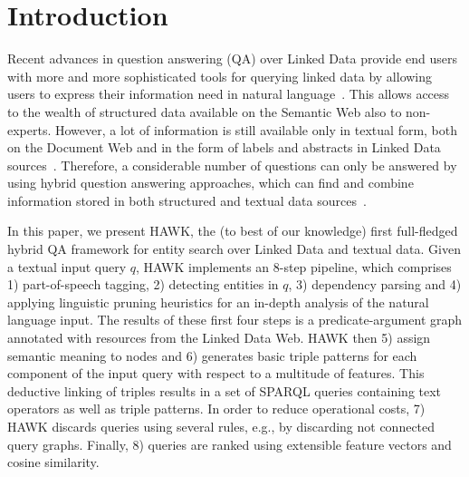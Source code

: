 \documentclass{llncs}
\begin{document}
\section{Introduction}
Recent advances in question answering (QA) over Linked Data provide end users with more and more sophisticated tools for querying linked data by allowing users to express their information need in natural language~\cite{SINA_WebSemantic,tbsl,pythia}. 
This allows access to the wealth of structured data available on the Semantic Web also to non-experts. However, a lot of information is still available only in textual form, both on the Document Web and in the form of labels and abstracts in Linked Data sources~\cite{rdflivenews}.
Therefore, a considerable number of questions can only be answered by using hybrid question answering approaches, which  can find and combine information stored in both structured and textual data sources~\cite{combiningLDandIR}.

In this paper, we present HAWK, the (to best of our knowledge) first full-fledged hybrid QA framework for entity search over Linked Data and textual data. 
Given a textual input query $q$, HAWK implements an 8-step pipeline, which comprises 1) part-of-speech tagging, 2) detecting entities in $q$, 3) dependency parsing and 4) applying linguistic pruning heuristics for an in-depth analysis of the natural language input. 
The results of these first four steps is a predicate-argument graph annotated with resources from the Linked Data Web. HAWK then 5) assign semantic meaning to nodes and 6) generates basic triple patterns for each component of the input query with respect to a multitude of features. 
This deductive linking of triples results in a set of SPARQL queries containing text operators as well as triple patterns.
In order to reduce operational costs, 7) HAWK discards queries using several rules, e.g., by  discarding not connected query graphs.
Finally, 8) queries are ranked using extensible feature vectors and cosine similarity.

\end{document}
